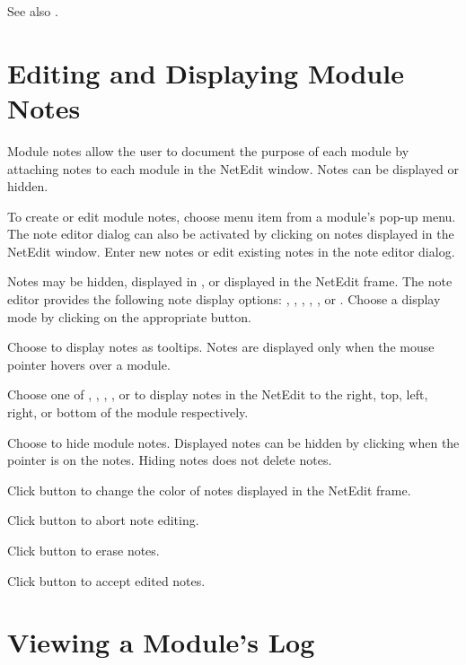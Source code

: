 See also .

\section{Editing and Displaying Module Notes}
\label{sec:modnotes}

Module notes allow the user to document the purpose of each module by
attaching notes to each module in the NetEdit window.  Notes can be
displayed or hidden.

To create or edit module notes, choose menu item 
from a module's pop-up menu. The note editor dialog can also be
activated by clicking  on notes displayed in the
NetEdit window.  Enter new notes or edit existing notes in the note
editor dialog.

Notes may be hidden, displayed in , or displayed in the
NetEdit frame.  The note editor provides the following note display
options: , , ,
, , or .  Choose a
display mode by clicking  on the appropriate button.

Choose  to display notes as tooltips.  Notes are
displayed only when the mouse pointer hovers over a module.

Choose one of , , ,
, or  to display notes in the
NetEdit to the right, top, left, right, or bottom of the module
respectively. 

Choose  to hide module notes.  Displayed notes can be
hidden by clicking  when the pointer is on the
notes.  Hiding notes does not delete notes.

Click button  to change the color of notes
displayed in the NetEdit frame.

Click button  to abort note editing.

Click button  to erase notes.

Click button  to accept edited notes.


\section{Viewing a Module's Log}
\label{sec:viewmodslog}

